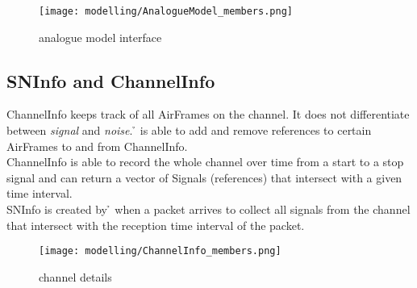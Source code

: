 %
 
\begin{figure}[H]
 \centering
 \texttt{[image: modelling/AnalogueModel\_members.png]}
 \caption{analogue model interface}
 \label{fig: analogue model interface}
\end{figure}
%





\subsection{SNInfo and ChannelInfo}

ChannelInfo keeps track of all AirFrames on the channel. It does not differentiate between \textit{signal} and \textit{noise}. \h{\bp} is able to
add and remove references to certain AirFrames to and from ChannelInfo.\\
ChannelInfo is able to record the whole channel over time from a start to a stop signal and can return a vector of Signals (references) that intersect with a given time interval.\\
SNInfo is created by \h{\bp} when a packet arrives to collect all signals from the channel that intersect with the reception time interval of the packet.

\begin{figure}[H]
 \centering
 \texttt{[image: modelling/ChannelInfo\_members.png]}
 \caption{channel details}
 \label{fig: channel details}
\end{figure}





